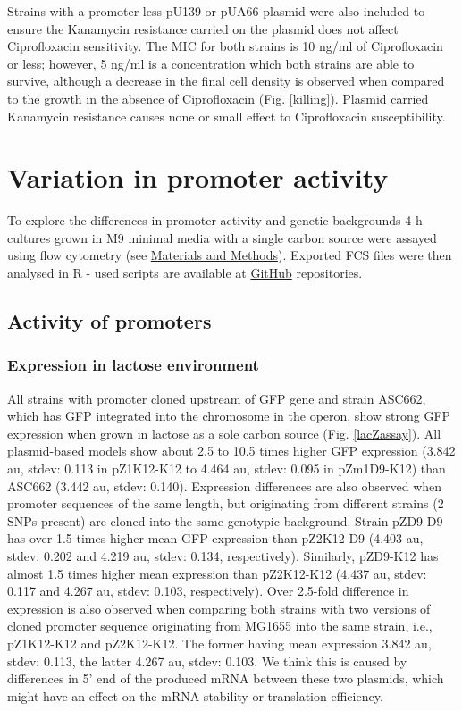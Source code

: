 Strains with a promoter-less pU139 or pUA66 plasmid were also included to ensure the Kanamycin resistance carried on the plasmid does not affect Ciprofloxacin sensitivity.
The MIC for both strains is 10 ng/ml of Ciprofloxacin or less; however, 5 ng/ml is a concentration which both strains are able to survive, although a decrease in the final cell density is observed when compared to the growth in the absence of Ciprofloxacin (Fig. \ref{killing}).
Plasmid carried Kanamycin resistance causes none or small effect to Ciprofloxacin susceptibility.


\section{Variation in promoter activity}
To explore the differences in promoter activity and genetic backgrounds 4 h cultures grown in M9 minimal media with a single carbon source were assayed using flow cytometry (see \hyperlink{FC}{Materials and Methods}).
Exported FCS files were then analysed in R - used scripts are available at \href{https://github.com/marketavlkova/}{GitHub} repositories.

\subsection{Activity of  promoters}
\subsubsection{Expression in lactose environment}
All strains with  promoter cloned upstream of GFP gene and strain ASC662, which has GFP integrated into the chromosome in the  operon, show strong GFP expression when grown in lactose as a sole carbon source (Fig. \ref{lacZassay}).
All plasmid-based models show about 2.5 to 10.5 times higher GFP expression (3.842 au, stdev: 0.113 in pZ1\textunderscore K12-K12 to 4.464 au, stdev: 0.095 in pZm1\textunderscore D9-K12) than ASC662 (3.442 au, stdev: 0.140).
Expression differences are also observed when promoter sequences of the same length, but originating from different strains (2 SNPs present) are cloned into the same genotypic background.
Strain pZ\textunderscore D9-D9 has over 1.5 times higher mean GFP expression than pZ2\textunderscore K12-D9 (4.403 au, stdev: 0.202 and 4.219 au, stdev: 0.134, respectively).
Similarly, pZ\textunderscore D9-K12 has almost 1.5 times higher mean expression than pZ2\textunderscore K12-K12 (4.437 au, stdev: 0.117 and 4.267 au, stdev: 0.103, respectively).
Over 2.5-fold difference in expression is also observed when comparing both strains with two versions of cloned promoter sequence originating from MG1655 into the same strain, i.e., pZ1\textunderscore K12-K12 and pZ2\textunderscore K12-K12.
The former having mean expression 3.842 au, stdev: 0.113, the latter 4.267 au, stdev: 0.103.
We think this is caused by differences in 5' end of the produced mRNA between these two plasmids, which might have an effect on the mRNA stability or translation efficiency.

